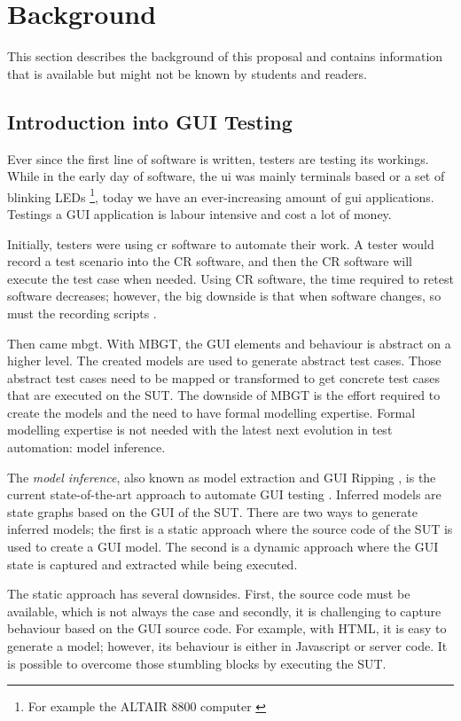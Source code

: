 \section{Background} \label{background}
This section describes the background of this proposal and contains information that is available but might not be known by students and readers. 

\subsection{Introduction into GUI Testing}
    Ever since the first line of software is written, testers are testing its workings. While in the early day of software, the \acrfull{ui} was mainly terminals based or a set of blinking LEDs \cite{altair8800} \footnote{For example the ALTAIR 8800 computer \cite{altair8800}}, today we have an ever-increasing amount of \acrfull{gui} applications. Testings a GUI application is labour intensive and cost a lot of money. \cite{gui-history}
    
    Initially, testers were using \acrfull{cr} software to automate their work. A tester would record a test scenario into the CR software, and then the CR software will execute the test case when needed. Using CR software, the time required to retest software decreases; however, the big downside is that when software changes, so must the recording scripts \cite{gui-history}.
    
    Then came \acrfull{mbgt}. With MBGT, the GUI elements and behaviour is abstract on a higher level. The created models are used to generate abstract test cases. Those abstract test cases need to be mapped or transformed to get concrete test cases that are executed on the SUT. The downside of MBGT is the effort required to create the models and the need to have formal modelling expertise. Formal modelling expertise is not needed with the latest next evolution in test automation: model inference. 
    
    The \emph{model inference}, also known as model extraction and GUI Ripping \cite{gui-ripping}, is the current state-of-the-art approach to automate GUI testing \cite{gui-history}. Inferred models are state graphs based on the GUI of the SUT. There are two ways to generate inferred models; the first is a static approach where the source code of the  SUT is used to create a GUI model. The second is a dynamic approach where the GUI state is captured and extracted while being executed. 
    
    The static approach has several downsides. First, the source code must be available, which is not always the case and secondly, it is challenging to capture behaviour based on the GUI source code. For example, with HTML, it is easy to generate a model; however, its behaviour is either in Javascript or server code.  It is possible to overcome those stumbling blocks by executing the SUT.
    

